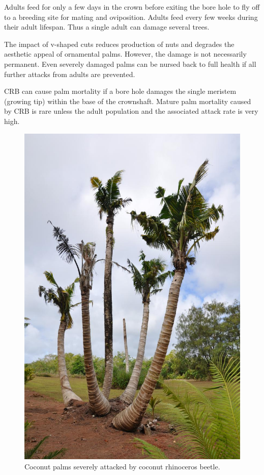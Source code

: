 \documentclass[twocolumn,letterpaper]{scrartcl}
\begin{document}
Adults feed for only a few days in the crown before exiting the bore hole to fly off to a breeding site for mating and oviposition. Adults feed every few weeks during their adult lifespan. Thus a single adult can damage several trees.

The impact of v-shaped cuts reduces production of nuts and degrades the aesthetic appeal of ornamental palms. However, the damage is not necessarily permanent. Even severely damaged palms can be nursed back to full health if all further attacks from adults are prevented.

CRB can cause palm mortality if a bore hole damages the single meristem (growing tip) within the base of the crownshaft. Mature palm mortality caused by CRB is rare unless the adult population and the associated attack rate is very high.   

\begin{figure}[h]
	\centering
	\includegraphics[width=0.8\linewidth]{images/dying_coconuts}
	\caption{Coconut palms severely attacked by coconut rhinoceros beetle.}
	\label{fig:dyingcoconuts}
\end{figure}
\end{document}
